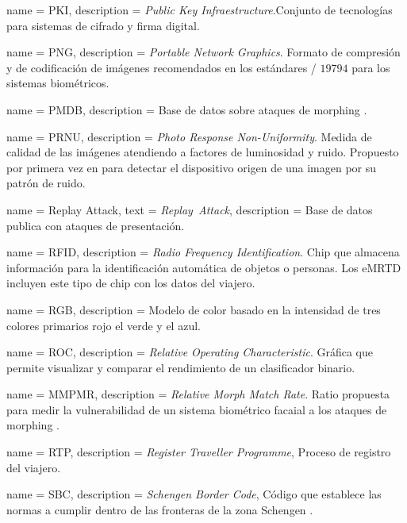 {
    name        = {PKI},
    description = {\textit{Public Key Infraestructure}.Conjunto de tecnologías para sistemas de cifrado y firma digital.}
}

{
    name        = {PNG},
    description = {\textit{Portable Network Graphics}. Formato de compresión y de codificación de imágenes recomendados en los estándares / $19794$ \cite{ISO/Format} para los sistemas biométricos.}
}

{
    name        = {PMDB},
    description = {Base de datos sobre ataques de \gls{morphing} \cite{ferrara2017face}.}
}

{
    name        = {PRNU},
    description = {\textit{Photo Response Non-Uniformity}. Medida de calidad de las imágenes atendiendo a factores de luminosidad y ruido. Propuesto por primera vez en \cite{lukas2006digital} para detectar el dispositivo origen de una imagen por su patrón de ruido.}
}

{
    name        = {Replay Attack},
    text        = {\mbox{\textit{Replay Attack}}},
    description = {Base de datos publica con ataques de presentación.}
}

{
    name        = {RFID},
    description = {\textit{Radio Frequency Identification}. Chip que almacena información para la identificación automática de objetos o personas. Los \gls{eMRTD} incluyen este tipo de chip con los datos del viajero.}
}

{
    name        = {RGB},
    description = {Modelo de color basado en la intensidad de tres colores primarios rojo el verde y el azul.}
}

{
    name        = {ROC},
    description = {\textit{Relative Operating Characteristic}. Gráfica que permite visualizar y comparar el rendimiento de un clasificador binario.}
}

{
    name        = {MMPMR},
    description = {\textit{Relative Morph Match Rate}. Ratio propuesta para medir la vulnerabilidad de un sistema biométrico facaial a los ataques de \gls{morphing} \cite{scherhag2017biometric}.}
}

{
    name        = {RTP},
    description = {\textit{Register Traveller Programme}, Proceso de registro del viajero.}
}

{
    name        = {SBC},
    description = {\textit{Schengen Border Code}, Código que establece las normas a cumplir dentro de las fronteras de la zona \Gls{Schengen} \cite{SBCode2016}.}
}
 
